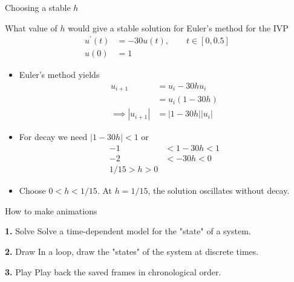 \documentclass[10pt]{beamer}
\begin{document}

\begin{frame}{Choosing a stable $h$}

\begin{example}
What value of $h$ would give a stable solution for Euler's method for the IVP
    \begin{align*}
    u^{'}(t) &= -30 u(t), \qquad  t \in [0,0.5]\\
    u(0) &= 1
    \end{align*}   

\end{example}
\begin{itemize}
    \item Euler's method yields 
        \begin{align*}
            u_{i+1} &= u_i  -30 h u_i \\ 
                    &= u_i(1 -30 h ) \\ 
            \implies |u_{i+1}| &= |1-30h| |u_i| 
        \end{align*}
    \item For decay we need $|1-30h| < 1$ or 
        \begin{align*}
            -1 &< 1-30h < 1\\
            -2 &< -30h < 0\\ 
             1/15 > h > 0
        \end{align*}
    \item Choose $0<h<1/15$. At $h=1/15$, the solution oscillates without decay.

\end{itemize}
\end{frame}	

\begin{frame}{How to make animations}

\begin{block}{\textbf{1.} Solve}
    Solve a time-dependent model for the "state" of a system.
\end{block}

\begin{block}{\textbf{2.} Draw}
    In a loop, draw the "states" of the system at discrete times. 
\end{block}

\begin{block}{\textbf{3.} Play}
    Play back the saved frames in chronological order.
\end{block}

\end{frame}
\end{document}
